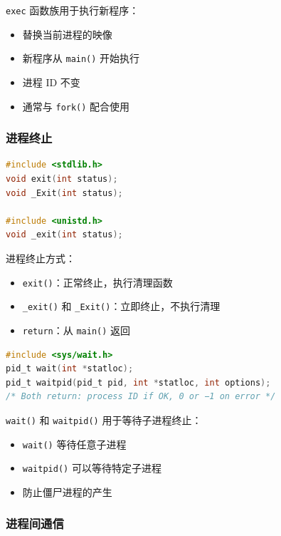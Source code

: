 \texttt{exec} 函数族用于执行新程序：
\begin{itemize}
  \item 替换当前进程的映像
  \item 新程序从 \texttt{main()} 开始执行
  \item 进程 ID 不变
  \item 通常与 \texttt{fork()} 配合使用
\end{itemize}

\subsubsection{进程终止}


\begin{lstlisting}[language=C]
#include <stdlib.h>
void exit(int status);
void _Exit(int status);

#include <unistd.h>
void _exit(int status);
\end{lstlisting}

进程终止方式：
\begin{itemize}
  \item \texttt{exit()}：正常终止，执行清理函数
  \item \texttt{\_exit()} 和 \texttt{\_Exit()}：立即终止，不执行清理
  \item \texttt{return}：从 \texttt{main()} 返回
\end{itemize}


\begin{lstlisting}[language=C]
#include <sys/wait.h>
pid_t wait(int *statloc);
pid_t waitpid(pid_t pid, int *statloc, int options);
/* Both return: process ID if OK, 0 or −1 on error */
\end{lstlisting}

\texttt{wait()} 和 \texttt{waitpid()} 用于等待子进程终止：
\begin{itemize}
  \item \texttt{wait()} 等待任意子进程
  \item \texttt{waitpid()} 可以等待特定子进程
  \item 防止僵尸进程的产生
\end{itemize}

\subsubsection{进程间通信}


